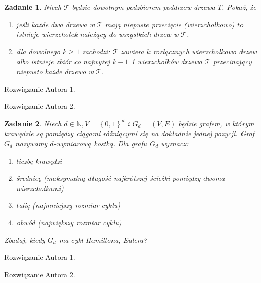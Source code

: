 \documentclass{mwart}
\newcommand{\N}{\mathbb{N}}
\newcommand{\T}{\mathcal{T}}
\newtheorem{zad}{Zadanie}[section]
\begin{document}
\begin{zad}
    Niech $\T$ będzie dowolnym podzbiorem poddrzew drzewa $T$. Pokaż, że
    \begin{enumerate}
        \item jeśli każde dwa drzewa w $\T$ mają niepuste przecięcie (wierzchołkowo) to istnieje
              wierzchołek należący do wszystkich drzew w $\T$.

        \item dla dowolnego $k \geq 1$ zachodzi: $\T$ zawiera $k$ rozłącznych wierzchołkowo drzew albo
              istnieje zbiór co najwyżej $k-1$ 1 wierzchołków drzewa $\T$ przecinający niepusto każde
              drzewo w $\T$.
    \end{enumerate}
\end{zad}
\begin{mdframed}
    Rozwiązanie Autora 1.
\end{mdframed}
\begin{mdframed}
    Rozwiązanie Autora 2.
\end{mdframed}



\begin{zad}
    Niech $d \in \N, V = \left\{0,1\right\}^d$ i $G_d=(V,E)$ będzie grafem, w którym krawędzie
    są pomiędzy ciągami różniącymi się na dokładnie jednej pozycji. Graf $G_d$ nazywamy
    $d$-wymiarową kostką. Dla grafu $G_d$ wyznacz:
    \begin{enumerate}
        \item liczbę krawędzi
        \item średnicę (maksymalną długość najkrótszej ścieżki pomiędzy dwoma wierzchołkami)
        \item talię (najmniejszy rozmiar cyklu)
        \item obwód (największy rozmiar cyklu)
    \end{enumerate}
    Zbadaj, kiedy $G_d$ ma cykl Hamiltona, Eulera?
\end{zad}
\begin{mdframed}
    Rozwiązanie Autora 1.
\end{mdframed}
\begin{mdframed}
    Rozwiązanie Autora 2.
\end{mdframed}
\end{document}
